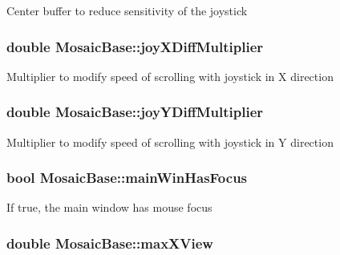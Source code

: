 Center buffer to reduce sensitivity of the joystick \hypertarget{class_mosaic_base_a34e740e98eebf938581b45f1f52cfdc9}{
\subsubsection[{joyXDiffMultiplier}]{\setlength{\rightskip}{0pt plus 5cm}double {\bf MosaicBase::joyXDiffMultiplier}}}
\label{class_mosaic_base_a34e740e98eebf938581b45f1f52cfdc9}
Multiplier to modify speed of scrolling with joystick in X direction \hypertarget{class_mosaic_base_a2525d465488cb3369cffb853be10371e}{
\subsubsection[{joyYDiffMultiplier}]{\setlength{\rightskip}{0pt plus 5cm}double {\bf MosaicBase::joyYDiffMultiplier}}}
\label{class_mosaic_base_a2525d465488cb3369cffb853be10371e}
Multiplier to modify speed of scrolling with joystick in Y direction \hypertarget{class_mosaic_base_a3a0a70f84bf767ff0f42bbac37123754}{
\subsubsection[{mainWinHasFocus}]{\setlength{\rightskip}{0pt plus 5cm}bool {\bf MosaicBase::mainWinHasFocus}}}
\label{class_mosaic_base_a3a0a70f84bf767ff0f42bbac37123754}
If true, the main window has mouse focus \hypertarget{class_mosaic_base_ab0d0a72f9f9028e90d92b059f60b7a5e}{
\subsubsection[{maxXView}]{\setlength{\rightskip}{0pt plus 5cm}double {\bf MosaicBase::maxXView}}}
